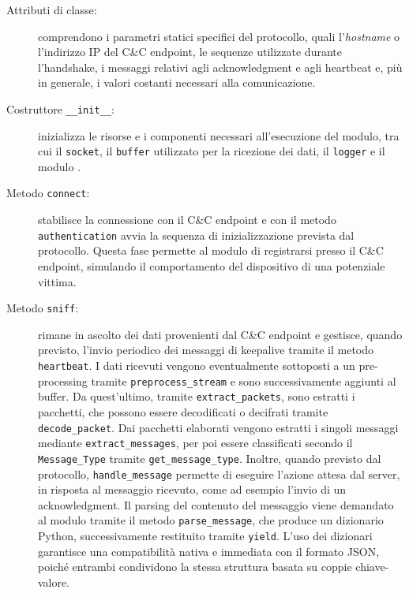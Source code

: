\begin{description}
    \item[Attributi di classe:] comprendono i parametri statici specifici del protocollo, quali l'\emph{hostname} o l'indirizzo IP del C\&C endpoint, le sequenze utilizzate durante l'handshake, i messaggi relativi agli acknowledgment e agli heartbeat e, più in generale, i valori costanti necessari alla comunicazione.
    
    \item[Costruttore \texttt{\_\_init\_\_}:] inizializza le risorse e i componenti necessari all'esecuzione del modulo, tra cui il \texttt{socket}, il \texttt{buffer} utilizzato per la ricezione dei dati, il \texttt{logger} e il modulo \parser{}. %
    
    \item[Metodo \texttt{connect}:] stabilisce la connessione con il C\&C endpoint e con il metodo \texttt{authentication} avvia la sequenza di inizializzazione prevista dal protocollo. Questa fase permette al modulo di registrarsi presso il C\&C endpoint, simulando il comportamento del dispositivo di una potenziale vittima.
    
    \item[Metodo \texttt{sniff}:] rimane in ascolto dei dati provenienti dal C\&C endpoint e gestisce, quando previsto, l'invio periodico dei messaggi di keepalive tramite il metodo \texttt{heartbeat}. I dati ricevuti vengono eventualmente sottoposti a un pre-processing tramite \texttt{preprocess\_stream} e sono successivamente aggiunti al buffer. Da quest'ultimo, tramite \texttt{extract\_packets}, sono estratti i pacchetti, che possono essere decodificati o decifrati tramite \texttt{decode\_packet}. Dai pacchetti elaborati vengono estratti i singoli messaggi mediante \texttt{extract\_messages}, per poi essere classificati secondo il \texttt{Message\_Type} tramite \texttt{get\_message\_type}. Inoltre, quando previsto dal protocollo, \texttt{handle\_message} permette di eseguire l'azione attesa dal server, in risposta al messaggio ricevuto, come ad esempio l'invio di un acknowledgment. Il parsing del contenuto del messaggio viene demandato al modulo \parser{} tramite il metodo \texttt{parse\_message}, che produce un dizionario Python, successivamente restituito tramite \texttt{yield}. L'uso dei dizionari garantisce una compatibilità nativa e immediata con il formato JSON, poiché entrambi condividono la stessa struttura basata su coppie chiave-valore.
    
\end{description}

